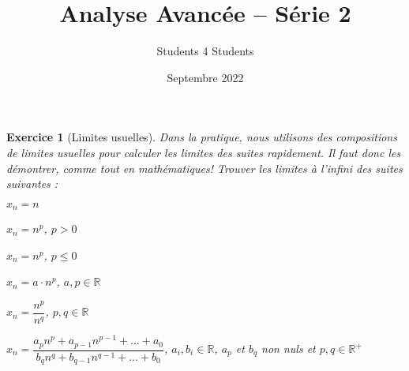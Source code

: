 \documentclass{article}
\title{\textbf{Analyse Avancée -- Série 2}}
\author{Students 4 Students}
\date{Septembre 2022}
\newcommand{\Nn}{{\mathbb{N}}}
\newcommand{\Rr}{{\mathbb{R}}}
\theoremstyle{exercice}
\newtheorem{exercice}{Exercice}
\begin{document}
\pagestyle{fancy}

\maketitle


\begin{exercice}[Limites usuelles]
    
Dans la pratique, nous utilisons des compositions de limites usuelles pour calculer les limites des suites rapidement. Il faut donc les démontrer, comme tout en mathématiques! Trouver les limites à l'infini des suites suivantes :

\begin{enumerate}
    

    \begin{multicols}{2}
    \item $x_n=n$
    \item $x_n= n^p$, $p>0$
    \item $x_n=n^p$, $p\leq 0$
    \item $x_n= a \cdot n^p$, $a,p\in \Rr$
    \item $x_n= \dfrac{n^p}{n^q}$, $p,q\in \Rr$
    \item $x_n=\dfrac{a_pn^p+a_{p-1}n^{p-1}+...+a_0}{b_qn^q+b_{q-1}n^{q-1}+...+b_0}$, $a_i,b_i\in \Rr$, $a_p$ et $b_q$ non nuls et $p,q \in \Rr ^+$
    \end{multicols}
\end{enumerate}
\end{exercice}
\newpage
\end{document}
